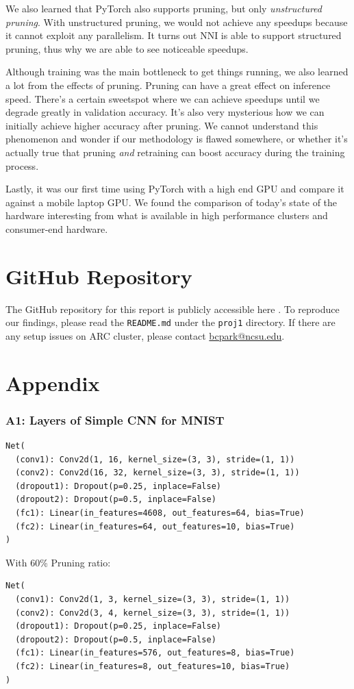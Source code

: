\documentclass{article}
\begin{document}
We also learned that PyTorch also supports pruning, but only \textit{unstructured pruning}. With unstructured pruning, we would not achieve any speedups because it cannot exploit any parallelism. It turns out NNI is able to support structured pruning, thus why we are able to see noticeable speedups.

Although training was the main bottleneck to get things running, we also learned a lot from the effects of pruning. Pruning can have a great effect on inference speed. There's a certain sweetspot where we can achieve speedups until we degrade greatly in validation accuracy. It's also very mysterious how we can initially achieve higher accuracy after pruning. We cannot understand this phenomenon and wonder if our methodology is flawed somewhere, or whether it's actually true that pruning \textit{and} retraining can boost accuracy during the training process.

Lastly, it was our first time using PyTorch with a high end GPU and compare it against a mobile laptop GPU. We found the comparison of today's state of the hardware interesting from what is available in high performance clusters and consumer-end hardware.

\section{GitHub Repository}
The GitHub repository for this report is publicly accessible here \cite{repo}. To reproduce our findings, please read the \verb|README.md| under the \verb|proj1| directory. If there are any setup issues on ARC cluster, please contact \href{mailto:bcpark@ncsu.edu}{bcpark@ncsu.edu}.




\section{Appendix}


\subsubsection{A1: Layers of Simple CNN for MNIST}
\label{sec:A1}
\begin{verbatim}
Net(
  (conv1): Conv2d(1, 16, kernel_size=(3, 3), stride=(1, 1))
  (conv2): Conv2d(16, 32, kernel_size=(3, 3), stride=(1, 1))
  (dropout1): Dropout(p=0.25, inplace=False)
  (dropout2): Dropout(p=0.5, inplace=False)
  (fc1): Linear(in_features=4608, out_features=64, bias=True)
  (fc2): Linear(in_features=64, out_features=10, bias=True)
)
\end{verbatim}
With 60\% Pruning ratio:
\begin{verbatim}
Net(
  (conv1): Conv2d(1, 3, kernel_size=(3, 3), stride=(1, 1))
  (conv2): Conv2d(3, 4, kernel_size=(3, 3), stride=(1, 1))
  (dropout1): Dropout(p=0.25, inplace=False)
  (dropout2): Dropout(p=0.5, inplace=False)
  (fc1): Linear(in_features=576, out_features=8, bias=True)
  (fc2): Linear(in_features=8, out_features=10, bias=True)
)
\end{verbatim}
\end{document}
